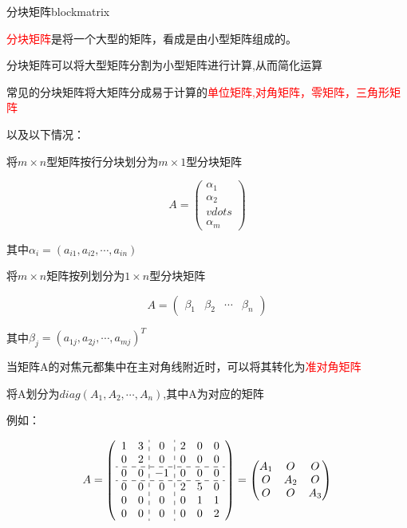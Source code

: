 \begin{definition}{分块矩阵}{blockmatrix}

	\textcolor{red}{分块矩阵}是将一个大型的矩阵，看成是由小型矩阵组成的。

	分块矩阵可以将大型矩阵分割为小型矩阵进行计算,从而简化运算
\end{definition}


常见的分块矩阵将大矩阵分成易于计算的\textcolor{red}{单位矩阵,对角矩阵，零矩阵，三角形矩阵}

以及以下情况：

将$m\times n$型矩阵按行分块划分为$m\times 1$型分块矩阵

$$
	A=\begin{pmatrix}
		\alpha_1 \\\alpha_2\\
		vdots    \\\alpha_m
	\end{pmatrix}
$$

其中$\alpha_i=(a_{i1},a_{i2},\cdots,a_{in})$

将$m\times n$矩阵按列划分为$1\times n$型分块矩阵

$$
	A=\begin{pmatrix}
		\beta_1 & \beta_2 & \cdots & \beta_n
	\end{pmatrix}
$$

其中$\beta_j=(a_{1j},a_{2j},\cdots,a_{mj})^T$

当矩阵A的对焦元都集中在主对角线附近时，可以将其转化为\textcolor{red}{准对角矩阵}

将A划分为$diag(A_1,A_2,\cdots,A_n)$,其中A为对应的矩阵

例如：

$$
	A=\left(
	\begin{array}{cc:c:ccc}
			1 & 3 & 0  & 2 & 0 & 0 \\
			0 & 2 & 0  & 0 & 0 & 0 \\
			\hdashline
			0 & 0 & -1 & 0 & 0 & 0 \\
			\hdashline
			0 & 0 & 0  & 2 & 5 & 0 \\
			0 & 0 & 0  & 0 & 1 & 1 \\
			0 & 0 & 0  & 0 & 0 & 2 \\
		\end{array}
	\right)=\begin{pmatrix}
		A_1 & O   & O   \\
		O   & A_2 & O   \\
		O   & O   & A_3 \\
	\end{pmatrix}
$$

